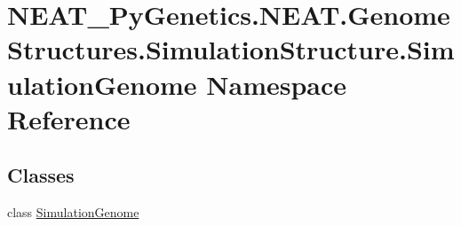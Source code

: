 \hypertarget{namespaceNEAT__PyGenetics_1_1NEAT_1_1GenomeStructures_1_1SimulationStructure_1_1SimulationGenome}{}\section{N\+E\+A\+T\+\_\+\+Py\+Genetics.\+N\+E\+A\+T.\+Genome\+Structures.\+Simulation\+Structure.\+Simulation\+Genome Namespace Reference}
\label{namespaceNEAT__PyGenetics_1_1NEAT_1_1GenomeStructures_1_1SimulationStructure_1_1SimulationGenome}
\subsection*{Classes}
\begin{DoxyCompactItemize}
\item 
class \hyperlink{classNEAT__PyGenetics_1_1NEAT_1_1GenomeStructures_1_1SimulationStructure_1_1SimulationGenome_1_1SimulationGenome}{Simulation\+Genome}
\end{DoxyCompactItemize}
